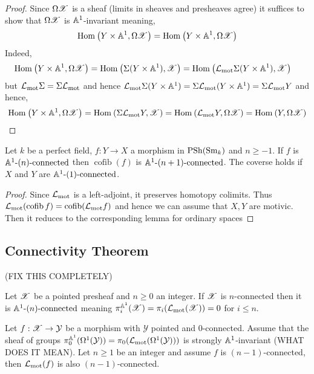 \documentclass[12pt]{article}
\DeclareMathOperator{\cofib}{\mathrm{cofib}}
\begin{document}
\begin{proof}
Since $\Omega \mathscr{X}$ is a sheaf (limits in sheaves and presheaves agree) it suffices to show that $\Omega \mathscr{X}$ is $\mathbb{A}^1$-invariant meaning,
\[ \mathrm{Hom}_{} \left( Y \times \mathbb{A}^1, \Omega \mathscr{X} \right) = \mathrm{Hom}_{} \left( Y \times \mathbb{A}^1, \Omega \mathscr{X} \right) \]
Indeed,
\begin{align*}
\mathrm{Hom}_{} \left( Y \times \mathbb{A}^1, \Omega \mathscr{X} \right) &= \mathrm{Hom}_{} \left( \Sigma(Y \times \mathbb{A}^1), \mathscr{X} \right) = \mathrm{Hom}_{} \left( \mathcal{L}_{\text{mot}} \Sigma(Y \times \mathbb{A}^1), \mathscr{X} \right)
\end{align*}
but $\mathcal{L}_{\text{mot}} \Sigma = \Sigma \mathcal{L}_{\text{mot}}$ and hence $\mathcal{L}_{\text{mot}} \Sigma(Y \times \mathbb{A}^1) = \Sigma \mathcal{L}_{\text{mot}} (Y \times \mathbb{A}^1) = \Sigma \mathcal{L}_{\text{mot}} Y$ and hence,
\[ \mathrm{Hom}_{} \left( Y \times \mathbb{A}^1, \Omega \mathscr{X} \right) = \mathrm{Hom}_{} \left( \Sigma \mathcal{L}_{\text{mot}} Y, \mathscr{X} \right) = \mathrm{Hom}_{} \left( \mathcal{L}_{\text{mot}} Y, \Omega \mathscr{X} \right) = \mathrm{Hom}_{} \left( Y, \Omega \mathscr{X} \right) \]
\end{proof}

\begin{lemma}[8.8]
Let $k$ be a perfect field, $f : Y \to X$ a morphism in $\mathrm{PSh}(\mathrm{Sm}_k)$ and $n \ge -1$. If $f$ is $\mathbb{A}^1\text{-}(n)\text{-connected}$ then $\cofib(f)$ is $\mathbb{A}^1\text{-}(n+1)\text{-connected}$. The coverse holds if $X$ and $Y$ are $\mathbb{A}^1\text{-}(1)\text{-connected}$.
\end{lemma}


\begin{proof}
Since $\mathcal{L}_{\text{mot}}$ is a left-adjoint, it preserves homotopy colimits. Thus $\L_{\mot}(\cofib f) = \cofib(\L_{\mot} f)$ and hence we can assume that $X, Y$ are motivic. Then it reduces to the corresponding lemma for ordinary spaces 
\end{proof}

\subsection{Connectivity Theorem}

(FIX THIS COMPLETELY)

\newcommand{\Y}{\mathcal{Y}}
\newcommand{\V}{\mathbb{V}}

\begin{theorem}[Mor12, 1.18]
Let $\mathscr{X}$ be a pointed presheaf and $n \ge 0$ an integer. If $\mathscr{X}$ is $n$-connected then it is $\mathbb{A}^1\text{-}(n)\text{-connected}$ meaning $\pi_i^{\mathbb{A}^1}(\mathscr{X}) = \pi_i(\mathcal{L}_{\text{mot}}(\mathscr{X})) = 0$ for $i \le n$.
\end{theorem}

\begin{theorem}[Mor12, 6.56]
Let $f : \X \to \Y$ be a morphism with $\Y$ pointed and $0$-connected. Assume that the sheaf of groups $\pi_0^{\A^1}(\Omega^1(\Y)) = \pi_0(\L_{\mot}(\Omega^1(\Y)))$ is strongly $\mathbb{A}^1$-invariant (WHAT DOES IT MEAN). Let $n \ge 1$ be an integer and assume $f$ is $(n-1)$-connected, then $\mathcal{L}_{\text{mot}}(f)$ is also $(n-1)$-connected. 
\end{theorem}
\end{document}
